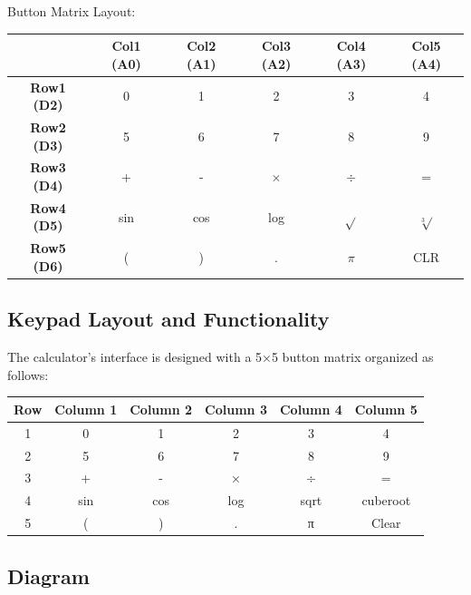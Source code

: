 \documentclass{article}
\begin{document}
\begin{center}
Button Matrix Layout:
\vspace{5pt}

\begin{tabular}{|c|c|c|c|c|c|}
\hline
 & \textbf{Col1 (A0)} & \textbf{Col2 (A1)} & \textbf{Col3 (A2)} & \textbf{Col4 (A3)} & \textbf{Col5 (A4)} \\
\hline
\textbf{Row1 (D2)} & 0 & 1 & 2 & 3 & 4 \\
\hline
\textbf{Row2 (D3)} & 5 & 6 & 7 & 8 & 9 \\
\hline
\textbf{Row3 (D4)} & + & - & $\times$ & $\div$ & = \\
\hline
\textbf{Row4 (D5)} & sin & cos & log & $\sqrt{ }$ & $\sqrt[3]{ }$ \\
\hline
\textbf{Row5 (D6)} & ( & ) & . & $\pi$ & CLR \\
\hline
\end{tabular}
\end{center}



\subsection{Keypad Layout and Functionality}
The calculator's interface is designed with a 5×5 button matrix organized as follows:

\begin{center}
\begin{tabular}{|c|c|c|c|c|c|}
\hline
Row & Column 1 & Column 2 & Column 3 & Column 4 & Column 5 \\
\hline
1 & 0 & 1 & 2 & 3 & 4 \\
2 & 5 & 6 & 7 & 8 & 9 \\
3 & + & - & × & ÷ & = \\
4 & sin & cos & log & sqrt & cuberoot \\
5 & ( & ) & . & π & Clear \\
\hline
\end{tabular}
\end{center}

\subsection{Diagram}
\end{document}
